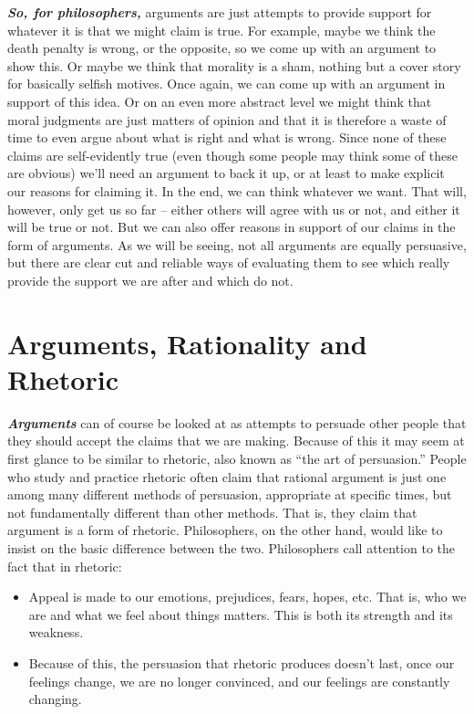 \documentclass[
  12pt, openany]{book}
\begin{document}
\textbf{\emph{So, for philosophers,}} arguments are just attempts to provide support for whatever it is that we might claim is true. For example, maybe we think the death penalty is wrong, or the opposite, so we come up with an argument to show this. Or maybe we think that morality is a sham, nothing but a cover story for basically selfish motives. Once again, we can come up with an argument in support of this idea. Or on an even more abstract level we might think that moral judgments are just matters of opinion and that it is therefore a waste of time to even argue about what is right and what is wrong. Since none of these claims are self-evidently true (even though some people may think some of these are obvious) we'll need an argument to back it up, or at least to make explicit our reasons for claiming it. In the end, we can think whatever we want. That will, however, only get us so far -- either others will agree with us or not, and either it will be true or not. But we can also offer reasons in support of our claims in the form of arguments. As we will be seeing, not all arguments are equally persuasive, but there are clear cut and reliable ways of evaluating them to see which really provide the support we are after and which do not.

\hypertarget{arguments-rationality-and-rhetoric}{%
\section{Arguments, Rationality and Rhetoric}\label{arguments-rationality-and-rhetoric}}

\textbf{\emph{Arguments}} can of course be looked at as attempts to persuade other people that they should accept the claims that we are making. Because of this it may seem at first glance to be similar to rhetoric, also known as ``the art of persuasion.'' People who study and practice rhetoric often claim that rational argument is just one among many different methods of persuasion, appropriate at specific times, but not fundamentally different than other methods. That is, they claim that argument is a form of rhetoric. Philosophers, on the other hand, would like to insist on the basic difference between the two. Philosophers call attention to the fact that in rhetoric:

\begin{itemize}
\item
  Appeal is made to our emotions, prejudices, fears, hopes, etc. That is, who we are and what we feel about things matters. This is both its strength and its weakness.
\item
  Because of this, the persuasion that rhetoric produces doesn't last, once our feelings change, we are no longer convinced, and our feelings are constantly changing.
\end{itemize}
\end{document}
